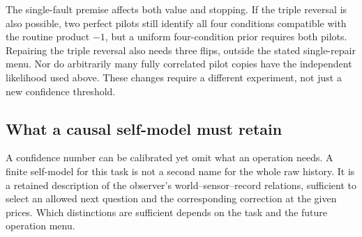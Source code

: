 \documentclass[12pt]{article}
\theoremstyle{definition}
\theoremstyle{remark}
\begin{document}
The single-fault premise affects both value and stopping. If the
triple reversal is also possible, two perfect pilots still identify
all four conditions compatible with the routine product $-1$,
but a uniform four-condition prior requires both pilots. Repairing
the triple reversal also needs three flips, outside the stated
single-repair menu. Nor do arbitrarily many fully correlated pilot
copies have the independent likelihood used above. These changes
require a different experiment, not just a new confidence threshold.

\subsection{What a causal self-model must retain}

A confidence number can be calibrated yet omit what an operation
needs. A finite self-model for this task is not a second name for
the whole raw history. It is a retained description of the
observer's world--sensor--record relations, sufficient to select
an allowed next question and the corresponding correction at the
given prices. Which distinctions are sufficient depends on the
task and the future operation menu.
\end{document}
